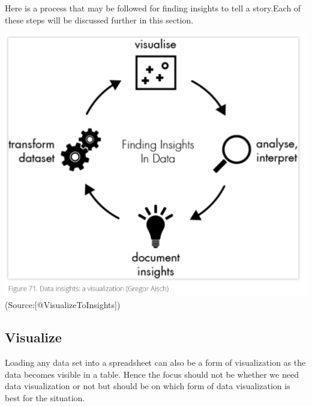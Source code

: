 \documentclass[]{book}
\theoremstyle{definition}
\theoremstyle{definition}
\theoremstyle{definition}
\theoremstyle{remark}
\begin{document}
Here is a process that may be followed for finding insights to tell a
story.Each of these steps will be discussed further in this section.

\includegraphics{images/DataInsights.JPG}
(Source:{[}@VisualizeToInsights{]})

\subsection{Visualize}\label{visualize}

Loading any data set into a spreadsheet can also be a form of
visualization as the data becomes visible in a table. Hence the focus
should not be whether we need data visualization or not but should be on
which form of data visualization is best for the situation.
\end{document}
